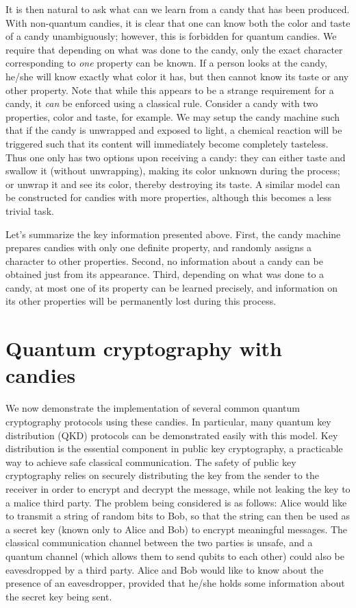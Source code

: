 \documentclass{article}
\begin{document}
It is then natural to ask what can we learn from a candy that has been produced.
With non-quantum candies, it is clear that one can know both the color and taste of a candy unambiguously; however, this is forbidden for quantum candies.
We require that depending on what was done to the candy, only the exact character corresponding to \textit{one} property can be known.
If a person looks at the candy, he/she will know exactly what color it has, but then cannot know its taste or any other property.
Note that while this appears to be a strange requirement for a candy, it \textit{can} be enforced using a classical rule.
Consider a candy with two properties, color and taste, for example.
We may setup the candy machine such that if the candy is unwrapped and exposed to light, a chemical reaction will be triggered such that its content will immediately become completely tasteless.
Thus one only has two options upon receiving a candy: they can either taste and swallow it (without unwrapping), making its color unknown during the process; or unwrap it and see its color, thereby destroying its taste.
A similar model can be constructed for candies with more properties, although this becomes a less trivial task.

Let's summarize the key information presented above.
First, the candy machine prepares candies with only one definite property, and randomly assigns a character to other properties.
Second, no information about a candy can be obtained just from its appearance.
Third, depending on what was done to a candy, at most one of its property can be learned precisely, and information on its other properties will be permanently lost during this process.


\section{Quantum cryptography with candies}
We now demonstrate the implementation of several common quantum cryptography protocols using these candies.
In particular, many quantum key distribution (QKD) protocols can be demonstrated easily with this model.
Key distribution is the essential component in public key cryptography, a practicable way to achieve safe classical communication.
The safety of public key cryptography relies on securely distributing the key from the sender to the receiver in order to encrypt and decrypt the message, while not leaking the key to a malice third party.
The problem being considered is as follows: Alice would like to transmit a string of random bits to Bob, so that the string can then be used as a secret key (known only to Alice and Bob) to encrypt meaningful messages.
The classical communication channel between the two parties is unsafe, and a quantum channel (which allows them to send qubits to each other) could also be eavesdropped by a third party.
Alice and Bob would like to know about the presence of an eavesdropper, provided that he/she holds some information about the secret key being sent. 
\end{document}

